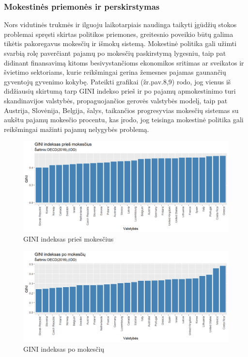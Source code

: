 \documentclass[12pt,a4paper,titlepage]{article}
\begin{document}
\subsubsection{Mokestinės priemonės ir perskirstymas}
Nors vidutinės trukmės ir ilguoju laikotarpiais naudinga taikyti įgūdžių stokos problemai spręsti skirtas politikos priemones, greitesnio poveikio būtų galima tikėtis pakoregavus mokesčių ir išmokų sistemą. Mokestinė politika gali užimti svarbią rolę paverčiant pajamų po mokesčių paskirstymą lygesniu, taip pat didinant finansavimą kitoms besivystančioms ekonomikos sritimas ar sveikatos ir švietimo sektoriams, kurie reikšmingai gerina žemesnes pajamas gaunančių gyventojų gyvenimo kokybę. 
Pateikti grafikai (žr.pav.8,9) rodo, jog vienus iš didžiausių skirtumą tarp GINI indekso prieš ir po pajamų apmokestinimo turi skandinavijos valstybės, propaguojančios gerovės valstybės modelį, taip pat Austrija, Slovėnija, Belgija, šalys, taikančios progresyvias mokesčių sistemas su aukštu pajamų mokesčio procentu, kas įrodo, jog teisinga mokestinė politika gali reikšmingai mažinti pajamų nelygybės problemą. 
\begin{figure}[H]
\includegraphics[scale=0.7]{ginibeforetaxation.png}
\caption{GINI indeksas prieš mokesčius}
\end{figure}
\begin{figure}[H]
\includegraphics[scale=0.7]{giniaftertaxation.png}
\caption{GINI indeksas po mokesčių}
\end{figure}
\end{document}
